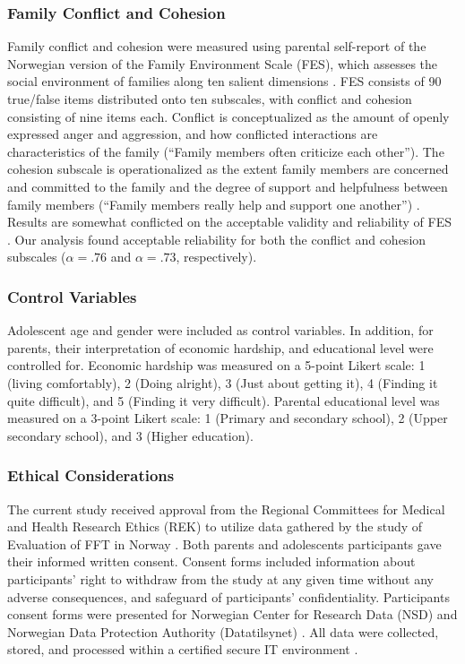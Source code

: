 \documentclass{sn-jnl}                  %
\begin{document}
\subsubsection{Family Conflict and Cohesion}

Family conflict and cohesion were measured using parental self-report of the Norwegian version of the Family Environment Scale (FES), which assesses the social environment of families along ten salient dimensions \citep{moos:1976}. FES consists of 90 true/false items distributed onto ten subscales, with conflict and cohesion consisting of nine items each. Conflict is conceptualized as the amount of openly expressed anger and aggression, and how conflicted interactions are characteristics of the family (``Family members often criticize each other''). The cohesion subscale is operationalized as the extent family members are concerned and committed to the family and the degree of support and helpfulness between family members (``Family members really help and support one another'') \citep{moos:1976, lucia:2006}. Results are somewhat conflicted on the acceptable validity and reliability of FES \citep{moos:1990, moos:2009, roosa:1990}. Our analysis found acceptable reliability for both the conflict and cohesion subscales ($\alpha = .76$ and $\alpha = .73$, respectively).

\subsubsection{Control Variables}

Adolescent age and gender were included as control variables. In addition, for parents, their interpretation of economic hardship, and educational level were controlled for. Economic hardship was measured on a 5-point Likert scale: 1 (living comfortably), 2 (Doing alright), 3 (Just about getting it), 4 (Finding it quite difficult), and 5 (Finding it very difficult). Parental educational level was measured on a 3-point Likert scale: 1 (Primary and secondary school), 2 (Upper secondary school), and 3 (Higher education).

\subsubsection{Ethical Considerations}

The current study received approval from the Regional Committees for Medical and Health Research Ethics (REK) to utilize data gathered by the study of Evaluation of FFT in Norway \citep{bjornebekk:2013}. Both parents and adolescents participants gave their informed written consent. Consent forms included information about participants' right to withdraw from the study at any given time without any adverse consequences, and safeguard of participants' confidentiality. Participants consent forms were presented for Norwegian Center for Research Data (NSD) and Norwegian Data Protection Authority (Datatilsynet) \citep{bjornebekk:2013}. All data were collected, stored, and processed within a certified secure IT environment \citep[TSD, ][]{tsd:2020}.
\end{document}
